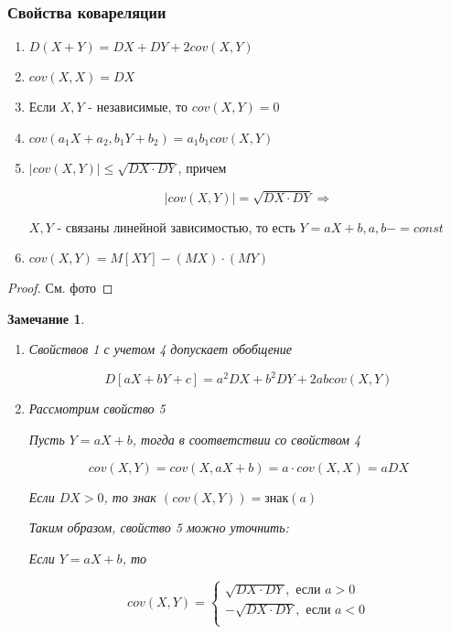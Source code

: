 \documentclass[a4paper, 14pt]{report}
\newtheorem{note}{Замечание}[section]
\begin{document}
\subsubsection{Свойства ковареляции}

\begin{enumerate}
    \item $D(X+Y) = DX + DY + 2cov(X,Y)$
    \item $cov(X,X) = DX$
    \item Если $X,Y$ - независимые, то $cov(X,Y) = 0$
    \item $cov(a_1 X + a_2, b_1 Y + b_2) = a_1b_1 cov(X,Y)$
    \item $|cov(X,Y)| \le \sqrt{DX \cdot DY}$, причем

        $$
        |cov(X,Y)| = \sqrt{DX \cdot DY} \Rightarrow
        $$

        $X,Y$ - связаны линейной зависимостью, то есть $Y=aX+b, a,b-=const$

    \item $cov(X,Y) = M[XY] - (MX)\cdot(MY)$
\end{enumerate}


\begin{proof}
    См. фото
\end{proof}

\begin{note}
    \begin{enumerate}
        \item Свойствов 1 с учетом 4 допускает обобщение

            $$
            D[aX+bY+c] = a^2 DX + b^2 DY + 2ab cov(X,Y)
            $$

        \item Рассмотрим свойство 5

            Пусть $Y=aX+b$, тогда в соответствии со свойством 4

            $$
            cov(X,Y) = cov(X, aX+b) = a \cdot cov(X,X) = a DX
            $$

            Если $DX >0$, то знак $(cov(X,Y)) = \text{знак}(a)$

            Таким образом, свойство 5 можно уточнить:

            Если $Y = aX+b$, то

            $$
            cov(X,Y) =
            \begin{cases}
                \sqrt{DX \cdot DY}, \text{ если } a > 0 \\
                -\sqrt{DX \cdot DY}, \text{ если } a < 0 \\
            \end{cases}
            $$
    \end{enumerate}
\end{note}
\end{document}
